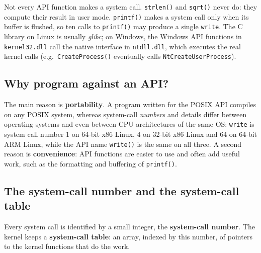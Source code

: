 \documentclass[11pt,a4paper]{article}
\newcommand{\term}[1]{\textbf{\color{mintdeep}#1}}
\newcommand{\cmd}[1]{\texttt{#1}}
\begin{document}
Not every API function makes a system call. \cmd{strlen()} and \cmd{sqrt()} never do: they compute their result in user mode. \cmd{printf()} makes a system call only when its buffer is flushed, so ten calls to \cmd{printf()} may produce a single \cmd{write}. The C library on Linux is usually \emph{glibc}; on Windows, the Windows API functions in \texttt{kernel32.dll} call the native interface in \texttt{ntdll.dll}, which executes the real kernel calls (e.g.\ \cmd{CreateProcess()} eventually calls \cmd{NtCreateUserProcess}).

\subsection{Why program against an API?}

The main reason is \textbf{portability}. A program written for the POSIX API compiles on any POSIX system, whereas system-call \emph{numbers} and details differ between operating systems and even between CPU architectures of the same OS: \cmd{write} is system call number $1$ on 64-bit x86 Linux, $4$ on 32-bit x86 Linux and $64$ on 64-bit ARM Linux, while the API name \cmd{write()} is the same on all three. A second reason is \textbf{convenience}: API functions are easier to use and often add useful work, such as the formatting and buffering of \cmd{printf()}.

\subsection{The system-call number and the system-call table}

Every system call is identified by a small integer, the \term{system-call number}. The kernel keeps a \term{system-call table}: an array, indexed by this number, of pointers to the kernel functions that do the work.
\end{document}
